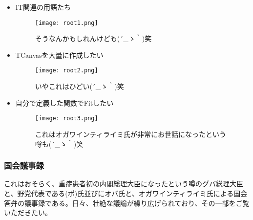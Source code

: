 \begin{itemize}
\item IT関連の用語たち
\begin{figure}[H]
  \centering
  \texttt{[image: root1.png]}
  \caption{そうなんかもしれんけども\sf (´\_ゝ｀)笑}
\label{root1}
\end{figure}

\newpage
\item TCanvasを大量に作成したい

\begin{figure}[H]
  \centering
  \texttt{[image: root2.png]}
  \caption{いやこれはひどい\sf (´\_ゝ｀)笑}
\label{root2}
\end{figure}

\item 自分で定義した関数でFitしたい

\begin{figure}[H]
  \centering
  \texttt{[image: root3.png]}
  \caption{これはオガワインティライミ氏が非常にお世話になったという噂も\sf (´\_ゝ｀)笑}
\label{root3}
\end{figure}

\end{itemize}

\subsubsection{国会議事録}
これはおそらく、重症患者初の内閣総理大臣になったという噂のグバ総理大臣と、野党代表である(ポ)氏並びにオバ氏と、オガワインティライミ氏による国会答弁の議事録である。日々、壮絶な議論が繰り広げられており、その一部をご覧いただきたい。\\

